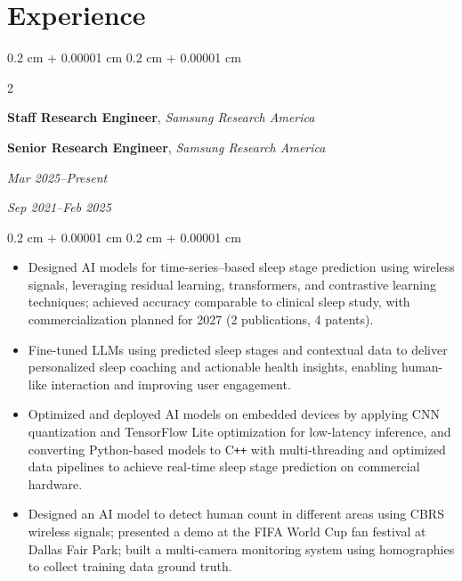 \documentclass[10pt, letterpaper]{article}
\newenvironment{highlights}{
    \begin{itemize}[
        topsep=0.10 cm,
        parsep=0.10 cm,
        partopsep=0pt,
        itemsep=0pt,
        leftmargin=0.4 cm + 10pt
    ]
}{
    \end{itemize}
} %
\newenvironment{onecolentry}{
    \begin{adjustwidth}{
        0.2 cm + 0.00001 cm
    }{
        0.2 cm + 0.00001 cm
    }
}{
    \end{adjustwidth}
} %
\newenvironment{twocolentry}[2][]{
    \onecolentry
    \def\secondColumn{#2}
    \setcolumnwidth{\fill, 3.5 cm}
    \begin{paracol}{2}
}{
    \switchcolumn \raggedleft \secondColumn
    \end{paracol}
    \endonecolentry
} %
\begin{document}
    
    \section{Experience}

        \begin{twocolentry}{  
            
        {\small \textit{Mar 2025–Present}}
        
        {\small \textit{Sep 2021–Feb 2025}}}

            \textbf{Staff Research Engineer}, \textit{Samsung Research America}

            \textbf{Senior Research Engineer}, \textit{Samsung Research America}

        \end{twocolentry}

        \vspace{0.10 cm}
        \begin{onecolentry}
            \begin{highlights}
                \item Designed AI models for time-series–based sleep stage prediction using wireless signals, leveraging residual learning, transformers, and contrastive learning techniques; achieved accuracy comparable to clinical sleep study, with commercialization planned for 2027 (2 publications, 4 patents).

                \item Fine-tuned LLMs using predicted sleep stages and contextual data to deliver personalized sleep coaching and actionable health insights, enabling human-like interaction and improving user engagement.

                
                \item Optimized and deployed AI models on embedded devices by applying CNN quantization and TensorFlow Lite optimization for low-latency inference, and converting Python-based models to C\texttt{++} with multi-threading and optimized data pipelines to achieve real-time sleep stage prediction on commercial hardware.

                \item Designed an AI model to detect human count in different areas using CBRS wireless signals; presented a demo at the FIFA World Cup fan festival at Dallas Fair Park; built a multi-camera monitoring system using homographies to collect training data ground truth.
                


            \end{highlights}
        \end{onecolentry}
\end{document}
